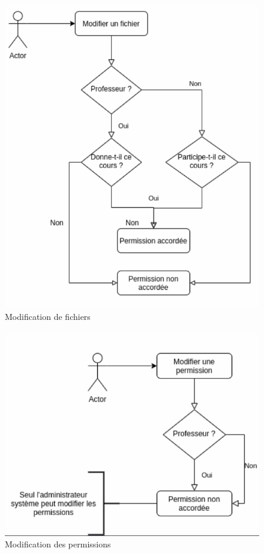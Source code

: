 \begin{figure}[H]
	\centering
	\includegraphics[scale=0.45]{images/edit.png}
	\caption{Modification de fichiers}
	\label{fig:edit}
\end{figure}


\begin{figure}[H]
	\centering
	\includegraphics[scale=0.45]{images/perms.png}
	\caption{Modification des permissions}
	\label{fig:perms}
\end{figure}

